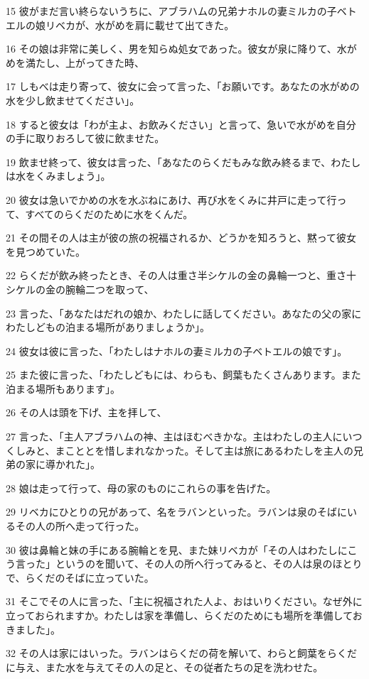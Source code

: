 \par 15 彼がまだ言い終らないうちに、アブラハムの兄弟ナホルの妻ミルカの子ベトエルの娘リベカが、水がめを肩に載せて出てきた。
\par 16 その娘は非常に美しく、男を知らぬ処女であった。彼女が泉に降りて、水がめを満たし、上がってきた時、
\par 17 しもべは走り寄って、彼女に会って言った、「お願いです。あなたの水がめの水を少し飲ませてください」。
\par 18 すると彼女は「わが主よ、お飲みください」と言って、急いで水がめを自分の手に取りおろして彼に飲ませた。
\par 19 飲ませ終って、彼女は言った、「あなたのらくだもみな飲み終るまで、わたしは水をくみましょう」。
\par 20 彼女は急いでかめの水を水ぶねにあけ、再び水をくみに井戸に走って行って、すべてのらくだのために水をくんだ。
\par 21 その間その人は主が彼の旅の祝福されるか、どうかを知ろうと、黙って彼女を見つめていた。
\par 22 らくだが飲み終ったとき、その人は重さ半シケルの金の鼻輪一つと、重さ十シケルの金の腕輪二つを取って、
\par 23 言った、「あなたはだれの娘か、わたしに話してください。あなたの父の家にわたしどもの泊まる場所がありましょうか」。
\par 24 彼女は彼に言った、「わたしはナホルの妻ミルカの子ベトエルの娘です」。
\par 25 また彼に言った、「わたしどもには、わらも、飼葉もたくさんあります。また泊まる場所もあります」。
\par 26 その人は頭を下げ、主を拝して、
\par 27 言った、「主人アブラハムの神、主はほむべきかな。主はわたしの主人にいつくしみと、まこととを惜しまれなかった。そして主は旅にあるわたしを主人の兄弟の家に導かれた」。
\par 28 娘は走って行って、母の家のものにこれらの事を告げた。
\par 29 リベカにひとりの兄があって、名をラバンといった。ラバンは泉のそばにいるその人の所へ走って行った。
\par 30 彼は鼻輪と妹の手にある腕輪とを見、また妹リベカが「その人はわたしにこう言った」というのを聞いて、その人の所へ行ってみると、その人は泉のほとりで、らくだのそばに立っていた。
\par 31 そこでその人に言った、「主に祝福された人よ、おはいりください。なぜ外に立っておられますか。わたしは家を準備し、らくだのためにも場所を準備しておきました」。
\par 32 その人は家にはいった。ラバンはらくだの荷を解いて、わらと飼葉をらくだに与え、また水を与えてその人の足と、その従者たちの足を洗わせた。
